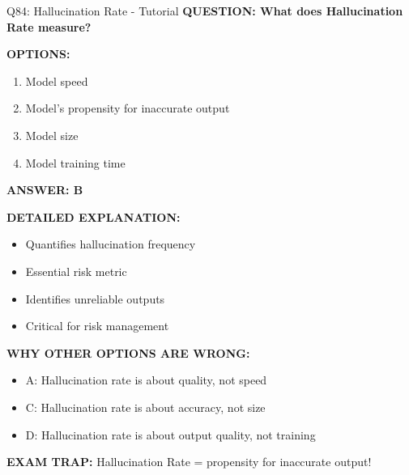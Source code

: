 \documentclass[8pt]{beamer}
\begin{document}
	\begin{frame}{Q84: Hallucination Rate - Tutorial}
		\fontsize{6.5}{7.5}\selectfont
		\textbf{QUESTION: What does Hallucination Rate measure?}
		
		\vspace{0.1cm}
		\textbf{OPTIONS:}
		\begin{enumerate}
			\item Model speed
			\item Model's propensity for inaccurate output
			\item Model size
			\item Model training time
		\end{enumerate}
		
		\vspace{0.1cm}
		\textcolor{myblue}{\textbf{ANSWER: B}}
		
		\vspace{0.1cm}
		\textbf{DETAILED EXPLANATION:}
		\begin{itemize}
			\item Quantifies hallucination frequency
			\item Essential risk metric
			\item Identifies unreliable outputs
			\item Critical for risk management
		\end{itemize}
		
		\vspace{0.1cm}
		\textcolor{myred}{\textbf{WHY OTHER OPTIONS ARE WRONG:}}
		\begin{itemize}
			\item \textcolor{myred}{A:} Hallucination rate is about quality, not speed
			\item \textcolor{myred}{C:} Hallucination rate is about accuracy, not size
			\item \textcolor{myred}{D:} Hallucination rate is about output quality, not training
		\end{itemize}
		
		\textcolor{myred}{\textbf{EXAM TRAP:}} Hallucination Rate = \textcolor{myblue}{propensity for inaccurate output}!
	\end{frame}
	
\end{document}
